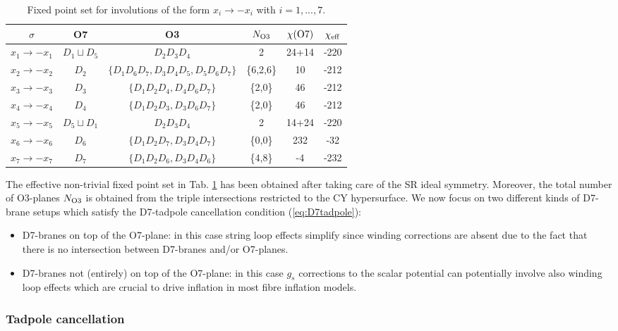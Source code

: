 \documentclass[11pt,a4paper]{article}
\newcommand{\bi}{\begin{itemize}}
\newcommand{\ei}{\end{itemize}}
\begin{document}
\begin{table}[H]
  \centering
 \begin{tabular}{|c|c|c|c|c|c|}
\hline
$\sigma$ & O7  & O3  & $N_{\rm O3}$  & $\chi({\rm O7})$ & $\chi_{\rm eff}$      \\
\hline
\hline
$x_1 \to -x_1$ &  $D_1 \sqcup D_5$ &  $D_2 D_3 D_4$ & 2 & 24+14 & -220 \\
$x_2 \to -x_2$ &  $D_2$ & $\{D_1 D_6 D_7, D_3 D_4 D_5, D_5 D_6 D_7\}$ & \{6,2,6\} & 10 & -212 \\
$x_3 \to -x_3$ &  $D_3$ & $\{D_1 D_2 D_4, D_4 D_6 D_7\}$ & \{2,0\} & 46 & -212 \\
$x_4 \to -x_4$ &  $D_4$ & $\{D_1 D_2 D_3, D_3 D_6 D_7\}$ & \{2,0\} & 46 & -212 \\
$x_5 \to -x_5$ &  $D_5 \sqcup D_1$ &  $D_2 D_3 D_4$ & 2 & 14+24 & -220 \\
$x_6 \to -x_6$ &  $D_6$ & $\{D_1 D_2 D_7, D_3 D_4 D_7\}$ & \{0,0\} & 232 & -32 \\
$x_7 \to -x_7$ &  $D_7$ &  $\{D_1 D_2 D_6, D_3 D_4 D_6\}$ & \{4,8\} & -4 & -232 \\
\hline
\end{tabular}
\caption{Fixed point set for involutions of the form $x_i \to -x_i$ with $i=1,...,7$.}  
\label{Tab6}
\end{table}

The effective non-trivial fixed point set in Tab. \ref{Tab6} has been obtained after taking care of the SR ideal symmetry. Moreover, the total number of O3-planes $N_{\rm O3}$ is obtained from the triple intersections restricted to the CY hypersurface. We now focus on two different kinds of D7-brane setups which satisfy the D7-tadpole cancellation condition (\ref{eq:D7tadpole}):
\bi
\item D7-branes on top of the O7-plane: in this case string loop effects simplify since winding corrections are absent due to the fact that there is no intersection between D7-branes and/or O7-planes.

\item D7-branes not (entirely) on top of the O7-plane: in this case $g_s$ corrections to the scalar potential can potentially involve also winding loop effects which are crucial to drive inflation in most fibre inflation models.
\ei 

\subsubsection{Tadpole cancellation}
\end{document}
